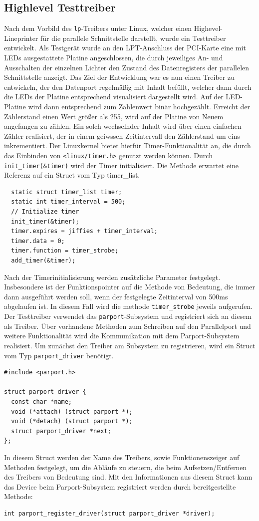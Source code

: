 \documentclass[a4paper,11pt]{article}
\begin{document}
\subsection{Highlevel Testtreiber}

Nach dem Vorbild des \verb|lp|-Treibers unter Linux, welcher einen Highevel-Lineprinter für die parallele Schnittstelle darstellt, wurde ein Testtreiber entwickelt. Als Testgerät wurde an den LPT-Anschluss der PCI-Karte eine mit LEDs ausgestattete Platine angeschlossen, die durch jeweiliges An- und Ausschalten der einzelnen Lichter den Zustand des Datenregisters der parallelen Schnittstelle anzeigt. Das Ziel der Entwicklung war es nun einen Treiber zu entwickeln, der den Datenport regelmäßig mit Inhalt befüllt, welcher dann durch die LEDs der Platine entsprechend visualisiert dargestellt wird. Auf der LED-Platine wird dann entsprechend zum Zahlenwert binär hochgezählt. Erreicht der Zählerstand einen Wert größer als 255, wird auf der Platine von Neuem angefangen zu zählen.
Ein solch wechselnder Inhalt wird über einen einfachen Zähler realisiert, der in einem geiwssen Zeitintervall den Zählerstand um eins inkrementiert. Der Linuxkernel bietet hierfür Timer-Funktionalität an, die durch das Einbinden von \verb|<linux/timer.h>| genutzt werden können. Durch \verb|init_timer(&timer)| wird der Timer initialisiert. Die Methode erwartet eine Referenz auf ein Struct vom Typ timer\_list. 
\begin{verbatim}
  static struct timer_list timer;
  static int timer_interval = 500;
  // Initialize timer
  init_timer(&timer);
  timer.expires = jiffies + timer_interval;
  timer.data = 0;
  timer.function = timer_strobe;
  add_timer(&timer);
\end{verbatim}
\noindent
Nach der Timerinitialisierung werden zusätzliche Parameter festgelegt. Insbesondere ist der Funktionspointer auf die Methode von Bedeutung, die immer dann ausgeführt werden soll, wenn der festgelegte Zeitinterval von 500ms abgelaufen ist. In diesem Fall wird die methode \verb|timer_strobe| jeweils aufgerufen.
\noindent \\
Der Testtreiber verwendet das \verb|parport|-Subsystem und registriert sich an diesem als Treiber. Über vorhandene Methoden zum Schreiben auf den Parallelport und weitere Funktionalität wird die Kommunikation mit dem Parport-Subsystem realisiert. Um zunächst den Treiber am Subsystem zu registrieren, wird ein Struct vom Typ \verb|parport_driver| benötigt.
\newpage
\begin{verbatim}
#include <parport.h>

struct parport_driver {
  const char *name;
  void (*attach) (struct parport *);
  void (*detach) (struct parport *);
  struct parport_driver *next;
};
\end{verbatim}
\noindent
In diesem Struct werden der Name des Treibers, sowie Funktionenszeiger auf Methoden festgelegt, um die Abläufe zu steuern, die beim Aufsetzen/Entfernen des Treibers von Bedeutung sind. Mit den Informationen aus diesem Struct kann das Device beim Parport-Subsystem registriert werden durch bereitgestellte Methode:
\begin{verbatim}
int parport_register_driver(struct parport_driver *driver);
\end{verbatim}
\end{document}
